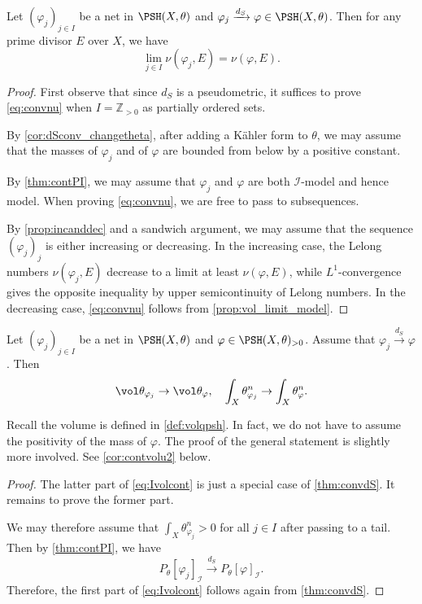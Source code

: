     \begin{theorem}\label{thm:Lelongcont}
        Let $(\varphi_j)_{j\in I}$ be a net in $\PSH(X,\theta)$ and $\varphi_j\xrightarrow{d_S}\varphi\in \PSH(X,\theta)$. Then for any prime divisor $E$ over $X$, we have
        \begin{equation}\label{eq:convnu}
        \lim_{j\in I}\nu(\varphi_j,E)=\nu(\varphi,E).
        \end{equation}
    \end{theorem}
\begin{proof}
    First observe that since $d_S$ is a pseudometric, it suffices to prove \eqref{eq:convnu} when $I=\mathbb{Z}_{>0}$ as partially ordered sets.

    By \cref{cor:dSconv_changetheta}, after adding a Kähler form to $\theta$, we may assume that the masses of $\varphi_j$ and of $\varphi$ are bounded from below by a positive constant.

    By \cref{thm:contPI}, we may assume that $\varphi_j$ and $\varphi$ are both $\mathcal{I}$-model and hence model. When proving \eqref{eq:convnu}, we are free to pass to subsequences.

    By \cref{prop:incanddec} and a sandwich argument, we may assume that the sequence $(\varphi_j)_j$ is either increasing or decreasing. In the increasing case, the Lelong numbers $\nu(\varphi_j,E)$ decrease to a limit at least $\nu(\varphi,E)$, while $L^1$-convergence gives the opposite inequality by upper semicontinuity of Lelong numbers. In the decreasing case, \eqref{eq:convnu} follows from \cref{prop:vol_limit_model}.
\end{proof}


\begin{theorem}\label{thm:contvolu}
    Let $(\varphi_j)_{j\in I}$ be a net in $\PSH(X,\theta)$ and $\varphi\in \PSH(X,\theta)_{>0}$. Assume that $\varphi_j\xrightarrow{d_S}\varphi$. Then
    \begin{equation}\label{eq:Ivolcont}
        \vol \theta_{\varphi_j}\to \vol \theta_{\varphi},\quad \int_X \theta_{\varphi_j}^n\to \int_X \theta_{\varphi}^n.
    \end{equation}
\end{theorem}
Recall the volume is defined in \cref{def:volqpsh}. In fact, we do not have to assume the positivity of the mass of $\varphi$. The proof of the general statement is slightly more involved. See \cref{cor:contvolu2} below.
\begin{proof}
    The latter part of \eqref{eq:Ivolcont} is just a special case of \cref{thm:convdS}. It remains to prove the former part.

    We may therefore assume that $\int_X \theta_{\varphi_j}^n>0$ for all $j\in I$ after passing to a tail. Then by \cref{thm:contPI}, we have
    \[
        P_{\theta}[\varphi_j]_{\mathcal{I}}\xrightarrow{d_S}P_{\theta}[\varphi]_{\mathcal{I}}.
    \]
    Therefore, the first part of \eqref{eq:Ivolcont} follows again from \cref{thm:convdS}.
\end{proof}

